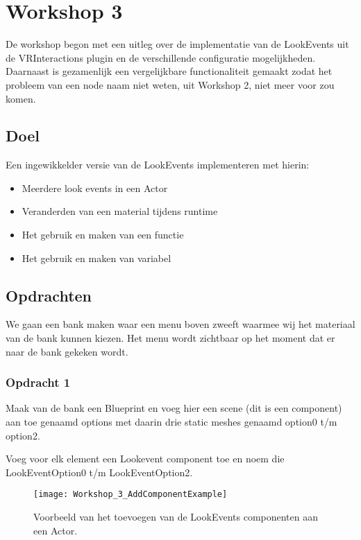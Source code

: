 
\chapter{Workshop 3}
\label{appendix:workshop3}
\lhead{}
De workshop begon met een uitleg over de implementatie van de LookEvents uit de VRInteractions plugin en de verschillende configuratie mogelijkheden. Daarnaast is gezamenlijk een vergelijkbare functionaliteit gemaakt zodat het probleem van een node naam niet weten, uit Workshop 2, niet meer voor zou komen.

\section{Doel}
Een ingewikkelder versie van de LookEvents implementeren met hierin:

\begin{itemize}
	\item Meerdere look events in een Actor
	\item Veranderden van een material tijdens runtime
	\item Het gebruik en maken van een functie
	\item Het gebruik en maken van variabel
\end{itemize}

\section{Opdrachten}

We gaan een bank maken waar een menu boven zweeft waarmee wij het materiaal van de bank kunnen kiezen. Het menu wordt zichtbaar op het moment dat er naar de bank gekeken wordt.

\subsection{Opdracht 1}
Maak van de bank een Blueprint en voeg hier een scene (dit is een component) aan toe genaamd options met daarin drie static meshes genaamd option0 t/m option2.

Voeg voor elk element een Lookevent component toe en noem die LookEventOption0 t/m LookEventOption2.

\begin{figure}[!ht]
  \centering
    \texttt{[image: Workshop\_3\_AddComponentExample]}
    \caption{Voorbeeld van het toevoegen van de LookEvents componenten aan een Actor.}
\end{figure}

